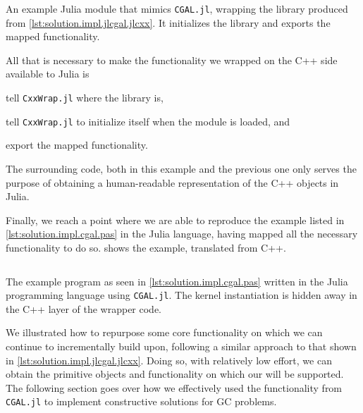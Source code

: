 \begin{listing}[htbp]
  \inputminted{julia}{jl/CGAL.jl}
  \caption[Bare-bones Julia module wrapping some of CGAL]{
    An example Julia module that mimics \texttt{CGAL.jl}, wrapping the library
    produced from \cref{lst:solution.impl.jlcgal.jlcxx}.  It initializes the
    library and exports the mapped functionality.}%
  \label{lst:solution.impl.jlcgal.cgal}
\end{listing}

All that is necessary to make the functionality we wrapped on the C++ side
available to Julia is
\begin{enumerate*}[label= (\arabic*)]
  \item tell \texttt{CxxWrap.jl} where the library is,
  \item tell \texttt{CxxWrap.jl} to initialize itself when the module is loaded,
  and
  \item export the mapped functionality.
\end{enumerate*}
The surrounding code, both in this example and the previous one only serves the
purpose of obtaining a human-readable representation of the C++ objects in
Julia.

Finally, we reach a point where we are able to reproduce the example listed in
\cref{lst:solution.impl.cgal.pas} in the Julia language, having mapped all the
necessary functionality to do so.   shows the
example, translated from C++.

\begin{listing}[htb]
  \inputminted{julia}{jl/points_and_segments.jl}
  \caption[CGAL.jl: Three points and one segment]{
    The example program as seen in \cref{lst:solution.impl.cgal.pas} written in
    the Julia programming language using \texttt{CGAL.jl}.  The kernel
    instantiation is hidden away in the C++ layer of the wrapper code.}%
  \label{lst:solution.impl.jlcgal.pas}
\end{listing}

We illustrated how to repurpose some core functionality on which we can continue
to incrementally build upon, following a similar approach to that shown in
\cref{lst:solution.impl.jlcgal.jlcxx}.  Doing so, with relatively low effort, we
can obtain the primitive objects and functionality on which our \primitives{}
will be supported.  The following section goes over how we effectively used the
functionality from \texttt{CGAL.jl} to implement constructive solutions for
\ac{GC} problems.
